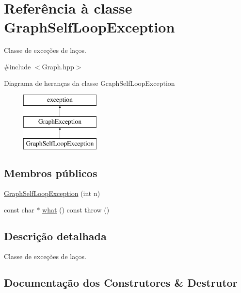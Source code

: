 \hypertarget{classGraphSelfLoopException}{}\section{Referência à classe Graph\+Self\+Loop\+Exception}
\label{classGraphSelfLoopException}


Classe de exceções de laços.  




{\ttfamily \#include $<$Graph.\+hpp$>$}

Diagrama de heranças da classe Graph\+Self\+Loop\+Exception\begin{figure}[H]
\begin{center}
\leavevmode
\includegraphics[height=3.000000cm]{classGraphSelfLoopException}
\end{center}
\end{figure}
\subsection*{Membros públicos}
\begin{DoxyCompactItemize}
\item 
\mbox{\hyperlink{classGraphSelfLoopException_ad9e05922cf212c3fcd30426bf30f982e}{Graph\+Self\+Loop\+Exception}} (int n)
\item 
const char $\ast$ \mbox{\hyperlink{classGraphSelfLoopException_ae608d642082d2183111b8a43a1bfa64f}{what}} () const  throw ()
\end{DoxyCompactItemize}


\subsection{Descrição detalhada}
Classe de exceções de laços. 

\subsection{Documentação dos Construtores \& Destrutor}
\mbox{\label{classGraphSelfLoopException_ad9e05922cf212c3fcd30426bf30f982e}} 

